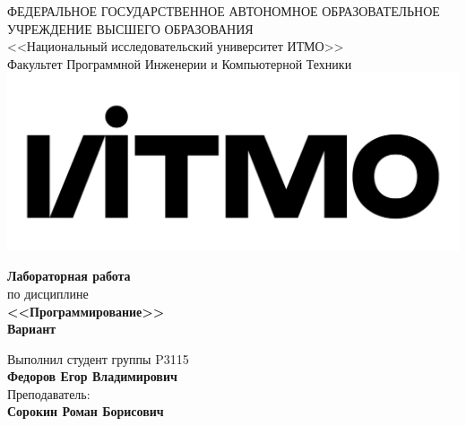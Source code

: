 \begin{titlepage}
\thispagestyle{firststyle}
\begin{center}
    ФЕДЕРАЛЬНОЕ ГОСУДАРСТВЕННОЕ АВТОНОМНОЕ ОБРАЗОВАТЕЛЬНОЕ УЧРЕЖДЕНИЕ ВЫСШЕГО ОБРАЗОВАНИЯ\\
    \vspace{0.5cm}
<<Национальный исследовательский университет ИТМО>>\\
Факультет Программной Инженерии и Компьютерной Техники \\
\vspace{1cm}
    \includegraphics[scale=0.1]{img/itmo_logo.png}
\end{center}

\vspace{1cm}

\begin{center}
    \large
    \textbf{Лабораторная работа }\\
    по дисциплине\\
    \textbf{<<Программирование>>} \\
     \textbf{Вариант }
\end{center}

\vspace{2cm}

\begin{flushright}
  Выполнил студент  группы P3115\\
  \textbf{Федоров Егор Владимирович} \\
  Преподаватель: \\
  \textbf{Сорокин Роман Борисович}\\
\end{flushright}

\end{titlepage}